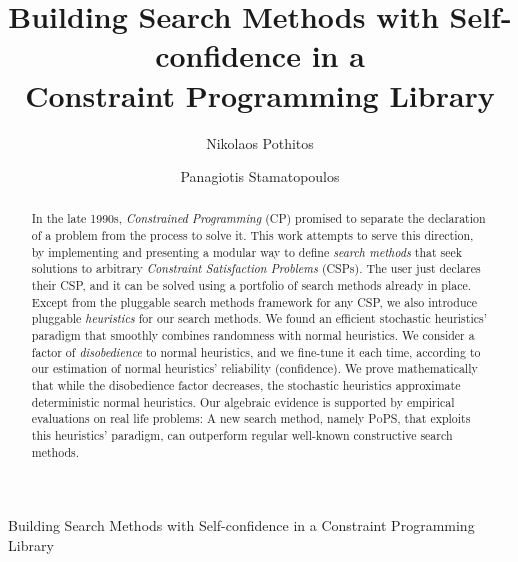 \documentclass{ws-ijait}
\begin{document}
         {Building Search Methods with Self-confidence in a
          Constraint Programming Library}

%
\catchline{}{}{}{}{}
%

\title{Building Search Methods with Self-confidence in a \\
       Constraint Programming Library}

\author{Nikolaos Pothitos \and Panagiotis Stamatopoulos}

\address{Department of Informatics and Telecommunications \\
         National and Kapodistrian University of Athens \\
         Panepistimiopolis, 157\,84 Athens, Greece \\
         \{pothitos,takis\}@di.uoa.gr}

\maketitle

\begin{history}
\end{history}

\begin{abstract}
  In the late 1990s, \emph{Constrained Programming} (CP)
  promised to separate the declaration of a problem from the
  process to solve it. This work attempts to serve this
  direction, by implementing and presenting a modular way to
  define \emph{search methods} that seek solutions to
  arbitrary \emph{Constraint Satisfaction Problems} (CSPs).
  The user just declares their CSP, and it can be solved
  using a portfolio of search methods already in place.
  Except from the pluggable search methods framework for any
  CSP, we also introduce pluggable \emph{heuristics} for our
  search methods. We found an efficient stochastic
  heuristics' paradigm that smoothly combines randomness
  with normal heuristics. We consider a factor of
  \emph{disobedience} to normal heuristics, and we fine-tune
  it each time, according to our estimation of normal
  heuristics' reliability (confidence). We prove
  mathematically that while the disobedience factor
  decreases, the stochastic heuristics approximate
  deterministic normal heuristics. Our algebraic evidence is
  supported by empirical evaluations on real life problems:
  A new search method, namely \textsc{PoPS}, that exploits
  this heuristics' paradigm, can outperform regular
  well-known constructive search methods.
\end{abstract}
\end{document}
